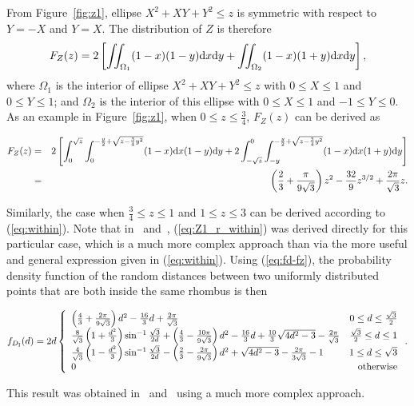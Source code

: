 \documentclass[12pt,draftclsnofoot,onecolumn]{IEEEtran}
\begin{document}
From Figure~\ref{fig:z1}, ellipse $X^2+XY+Y^2 \leq z$ is symmetric with respect
to $Y=-X$ and $Y=X$. The distribution of $Z$ is therefore
\begin{equation}\label{eq:within}
F_Z(z)=2\left[\iint_{\Omega_1}(1-x)(1-y){\rm d}x{\rm
d}y+\iint_{\Omega_2}(1-x)(1+y){\rm d}x{\rm d}y\right],
\end{equation}
where $\Omega_1$ is the interior of ellipse $X^2+XY+Y^2 \leq z$ with $0 \leq X
\leq 1$ and $0 \leq Y \leq 1$; and $\Omega_2$ is the interior of this ellipse with
$0 \leq X \leq 1$ and $-1 \leq Y \leq 0$. As an example in Figure~\ref{fig:z1},
when $0\leq z \leq \frac{3}{4}$, $F_Z(z)$ can be derived as
\begin{small}
\begin{eqnarray}\label{eq:Z1_r_within}
F_Z(z)&=&2\left[\int_{0}^{\sqrt{z}}\int_{0}^{-\frac{y}{2}+\sqrt{z-\frac{3}{4}y^2
}}(1-x){\rm d}x(1-y){\rm
d}y+2\int_{-\sqrt{z}}^0\int_{-y}^{-\frac{y}{2}+\sqrt{z-\frac{3}{4}
y^2}}(1-x){\rm d}x(1+y){\rm d}y\right] \nonumber\\
&=&\left(\frac{2}{3}+\frac{\pi}{9\sqrt{3}}\right)z^2-\frac{32}{9}z^{3/2}+\frac{
2\pi}{\sqrt{3}}z.
\end{eqnarray}
\end{small}%
Similarly, the case when $\frac{3}{4} \leq z \leq 1$ and $1 \leq z \leq 3$ can
be derived according to (\ref{eq:within}). Note that in~\cite{zhuang2011random}
and~\cite{zhuang2012geometrical}, (\ref{eq:Z1_r_within}) was derived directly
for this particular case, which is a much more complex approach than via the
more useful and general expression given in (\ref{eq:within}). Using (\ref{eq:fd-fz}), the
probability density function of the random distances between two uniformly
distributed points that are both inside the same rhombus is then
\begin{small}
 \begin{equation}\label{eq:fd_r_within}
  f_{D_{\rm I}}(d)=2d\left\{
    \begin{array}{lr}

\left(\frac{4}{3}+\frac{2\pi}{9\sqrt{3}}\right)d^2-\frac{16}{3}d+\frac{2\pi}{
\sqrt{3}} & 0\leq d\leq \frac{\sqrt{3}}{2}\\

\frac{8}{\sqrt{3}}\left(1+\frac{d^2}{3}\right)\sin^{-1}\frac{\sqrt{3}}{2d}
+\left(\frac{4}{3}-\frac{10\pi}{9\sqrt{3}}\right)d^2-\frac{16}{3}d+\frac{10}{3}
\sqrt{4d^2-3}-\frac{2\pi}{\sqrt{3}} & \frac{\sqrt{3}}{2}\leq d\leq 1\\

\frac{4}{\sqrt{3}}\left(1-\frac{d^2}{3}\right)\sin^{-1}\frac{\sqrt{3}}{2d}
-\left(\frac{2}{3}-\frac{2\pi}{9\sqrt{3}}\right)d^2+\sqrt{4d^2-3}-\frac{2\pi}{
3\sqrt{3}}-1 & 1\leq d\leq \sqrt{3} \\

      0 & {\rm otherwise}
    \end{array}
  \right..
\end{equation}
\end{small}
This result was obtained in~\cite{zhuang2011random} and~\cite{zhuang2012geometrical} using
a much more complex approach.
\end{document}
